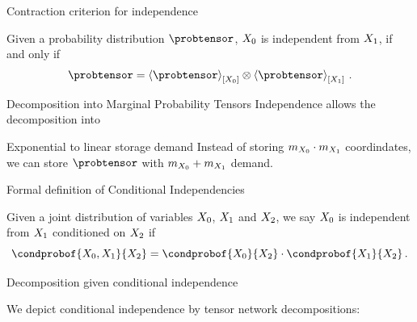 \documentclass{beamer}
\begin{document}
\begin{frame}{Contraction criterion for independence}

    \begin{theorem}\label{the:independenceProductCriterion}
        Given a probability distribution $\probtensor$, $X_{0}$ is independent from $X_{1}$, if and only if
        \begin{align*}
            \probtensor = \contractionof{\probtensor}{\exrandom} \otimes  \contractionof{\probtensor}{\secexrandom} \, .
        \end{align*}
    \end{theorem}

\end{frame}



\begin{frame}{Decomposition into Marginal Probability Tensors}
    Independence allows the decomposition into
    \begin{center}
        
    \end{center}

    \begin{block}{Exponential to linear storage demand}
        Instead of storing $m_{X_{0}}\cdot m_{X_{1}}$ coordindates, we can store $\probtensor$ with $m_{X_{0}}+m_{X_{1}}$ demand.
    \end{block}
\end{frame}






\begin{frame}{Formal definition of Conditional Independencies}

    \begin{definition}
	Given a joint distribution of variables $X_{0}$, $X_{1}$ and $X_{2}$, we say $X_{0}$ is independent from $X_{1}$ conditioned on $X_{2}$ if
    \[ \condprobof{\exrandom,\secexrandom}{\thirdexrandom}
    = \condprobof{\exrandom}{\thirdexrandom}
    \cdot \condprobof{\secexrandom}{\thirdexrandom}   \, . \]
    \end{definition}


\end{frame}


\begin{frame}{Decomposition given conditional independence}

    We depict conditional independence by tensor network decompositions:

    \begin{center}
        
    \end{center}

\end{frame}
\end{document}
